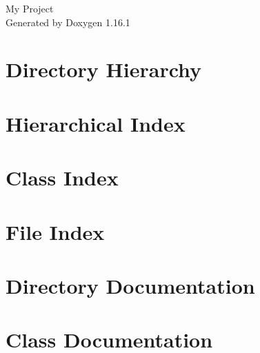 \documentclass[twoside]{book}
\newcommand{\+}{\discretionary{\mbox{\scriptsize$\hookleftarrow$}}{}{}}
\newcommand{\clearemptydoublepage}{%
    \newpage{\pagestyle{empty}\cleardoublepage}%
  }
\begin{document}
  \raggedbottom
    \hypersetup{pageanchor=false,
                bookmarksnumbered=true,
                pdfencoding=unicode
               }
  \begin{titlepage}
  \vspace*{7cm}
  \begin{center}%
  {\Large My Project}\\
  \vspace*{1cm}
  {\large Generated by Doxygen 1.16.1}\\
  \end{center}
  \end{titlepage}
  \clearemptydoublepage
  \tableofcontents
  \clearemptydoublepage
  \hypersetup{pageanchor=true}
\chapter{Directory Hierarchy}

\chapter{Hierarchical Index}

\chapter{Class Index}

\chapter{File Index}

\chapter{Directory Documentation}

\chapter{Class Documentation}





































\end{document}
